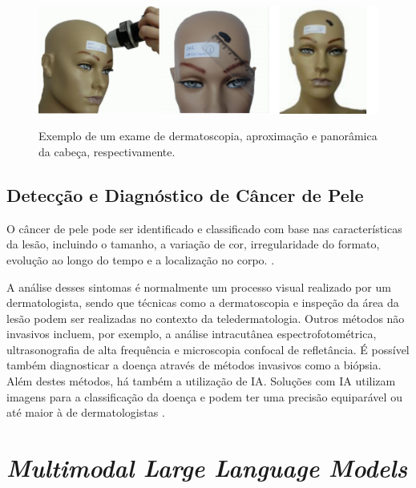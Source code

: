 \begin{figure}[ht]
      \centering
      \caption{\small Exemplo de um exame de dermatoscopia, aproximação e panorâmica da cabeça, respectivamente.}
      \includegraphics[width=1\columnwidth,keepaspectratio]{images/skin_lesion_exams.png}
      \label{fig:skin_lesion_exams}
\end{figure}

\subsection{Detecção e Diagnóstico de Câncer de Pele}

O câncer de pele pode ser identificado e classificado com base nas características da lesão, incluindo o tamanho, a variação de cor, irregularidade do formato,
evolução ao longo do tempo e a localização no corpo. \cite{recognizing_skin_cancer}.

A análise desses sintomas é normalmente um processo visual realizado por um dermatologista, sendo que técnicas como a dermatoscopia e inspeção da área da lesão podem
ser realizadas no contexto da teledermatologia. Outros métodos não invasivos incluem, por exemplo, a análise intracutânea espectrofotométrica, ultrasonografia de alta
frequência e microscopia confocal de refletância. É possível também diagnosticar a doença através de métodos invasivos como a biópsia. Além destes métodos, há também a
utilização de \ac{IA}. Soluções com \ac{IA} utilizam imagens para a classificação da doença e podem ter uma precisão equiparável ou até maior à de dermatologistas
\cite{recognizing_skin_cancer, skin_cancer_ai}.

\section{\textit{Multimodal Large Language Models}}

